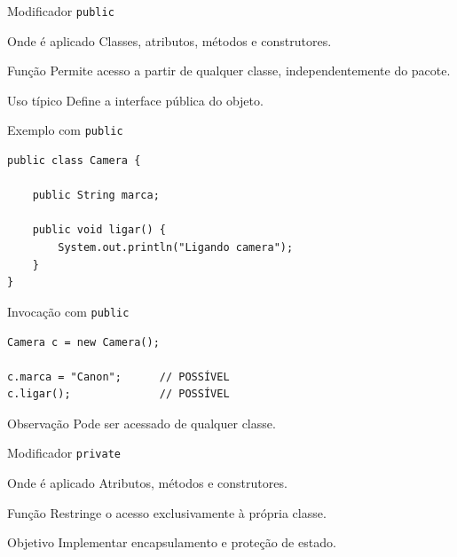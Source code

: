 \documentclass[9pt]{beamer}
\begin{document}
\begin{frame}{Modificador \texttt{public}}

\begin{block}{Onde é aplicado}
Classes, atributos, métodos e construtores.
\end{block}

\begin{block}{Função}
Permite acesso a partir de qualquer classe,
independentemente do pacote.
\end{block}

\begin{block}{Uso típico}
Define a interface pública do objeto.
\end{block}

\end{frame}
\begin{frame}[fragile]{Exemplo com \texttt{public}}

\begin{verbatim}
public class Camera {

    public String marca;

    public void ligar() {
        System.out.println("Ligando camera");
    }
}
\end{verbatim}

\end{frame}

\begin{frame}[fragile]{Invocação com \texttt{public}}

\begin{verbatim}
Camera c = new Camera();

c.marca = "Canon";      // POSSÍVEL
c.ligar();              // POSSÍVEL
\end{verbatim}

\begin{block}{Observação}
Pode ser acessado de qualquer classe.
\end{block}

\end{frame}

\begin{frame}{Modificador \texttt{private}}

\begin{block}{Onde é aplicado}
Atributos, métodos e construtores.
\end{block}

\begin{block}{Função}
Restringe o acesso exclusivamente à própria classe.
\end{block}

\begin{block}{Objetivo}
Implementar encapsulamento e proteção de estado.
\end{block}

\end{frame}
\end{document}
